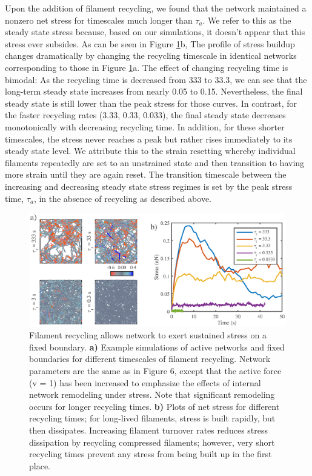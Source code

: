 \documentclass[10pt,letterpaper]{article}
\begin{document}
Upon the addition of filament recycling, we found that the network maintained a nonzero net stress for timescales much longer than $\tau_a$.  We refer to this as the steady state stress because, based on our simulations, it doesn't appear that this stress ever subsides.   As can be seen in Figure \ref{fig:active_rec}b, The profile of stress buildup changes dramatically by changing the recycling timescale in identical networks corresponding to those in Figure \ref{fig:active_rec}a.  The effect of changing recycling time is bimodal: As the recycling time is decreased from 333 to 33.3, we can see that the long-term steady state increases from nearly 0.05 to 0.15.  Nevertheless, the final steady state is still lower than the peak stress for those curves.  In contrast, for the faster recycling rates (3.33, 0.33, 0.033), the final steady state decreases monotonically with decreasing recycling time.  In addition, for these shorter timescales, the stress never reaches a peak but rather rises immediately to its steady state level.  We attribute this to the strain resetting whereby individual filaments repeatedly are set to an unstrained state and then transition to having more strain until they are again reset.  The transition timescale between the increasing and decreasing steady state stress regimes is set by the peak stress time, $\tau_a$, in the absence of recycling as described above.


\begin{figure}[h!]
	\centering
	\includegraphics[width=\hsize]{figures/figure5b}
	\caption{\label{fig:active_rec}  Filament recycling allows network to exert sustained stress on a fixed boundary. \textbf{a)}  Example simulations of active networks and fixed boundaries for different timescales of filament recycling. Network parameters are the same as in Figure 6, except that the active force (v = 1) has been increased to emphasize the effects of internal network remodeling under stress. Note that significant remodeling occurs for longer recycling times.  \textbf{b)} Plots of net stress for different recycling times; for long-lived filaments, stress is built rapidly, but then dissipates.  Increasing filament turnover rates reduces stress dissipation by recycling compressed filaments; however, very short recycling times prevent any stress from being built up in the first place. }
\end{figure}
\end{document}
